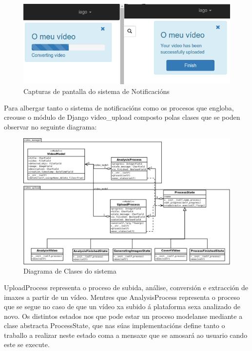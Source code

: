 		\begin{figure}[htp]
		\begin{center}
			\includegraphics[scale=0.5]{figures/Notificacions.png}
			\caption{Capturas de pantalla do sistema de Notificacións}
		\label{fig:Notificacions}
		\end{center}
		\end{figure}
		
		Para albergar tanto o sistema de notificacións como os procesos que engloba, creouse o módulo de 
		Django video\_upload composto polas clases que se poden observar no seguinte diagrama:

		\begin{figure}[htp]
		\begin{center}
			\includegraphics[scale=0.25]{figures/ClassDiagram.png}
			\caption{Diagrama de Clases do sistema}
		\label{fig:ClassDiagram}
		\end{center}
		\end{figure}
		
		UploadProcess representa o proceso de subida, análise, conversión e extracción de imaxes
		a partir de un vídeo. Mentres que AnalysisProcess representa o proceso que se segue no 
		caso de que un vídeo xa subido á plataforma sexa analizado de novo. Os distintos estados
		nos que pode estar un proceso modelanse mediante a clase abstracta ProcessState, que nas
		súas implementacións define tanto o traballo a realizar neste estado coma a mensaxe que 
		se amosará ao usuario cando este se execute.\\
		
